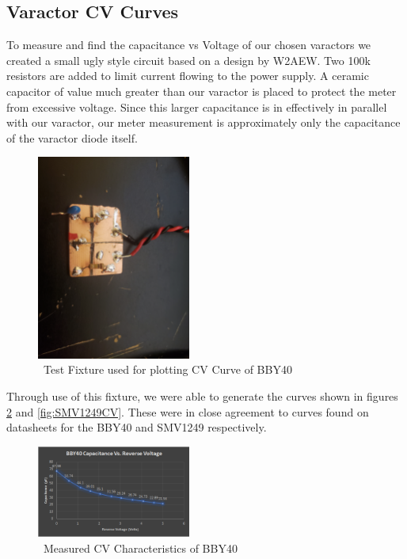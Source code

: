 \documentclass[journal]{IEEEtran}
\begin{document}
\subsection{Varactor CV Curves}\label{subsec:CVCurves}

To measure and find the capacitance vs Voltage of our chosen varactors we created a small ugly style circuit based on a design by W2AEW. Two 100k resistors are added to limit current flowing to the power supply. A ceramic capacitor of value much greater than our varactor is placed to protect the meter from excessive voltage. Since this larger capacitance is in effectively in parallel with our varactor, our meter measurement is approximately only the capacitance of the varactor diode itself. 

\begin{figure}[htb]
\centering
\includegraphics[width=0.45\textwidth]{BBY40_capacitance_testfixture}
\caption{\ Test Fixture used for plotting CV Curve of BBY40
}\label{fig:CVTestFixt}
\end{figure}



Through use of this fixture, we were able to generate the curves shown in figures \ref{fig:BBY40CV} and \ref{fig:SMV1249CV}. These were in close agreement to curves found on datasheets for the BBY40 and SMV1249 respectively.
 
\begin{figure}[htb]
\centering
\includegraphics[width=0.45\textwidth]{bbY40CV}
\caption{\ Measured CV Characteristics of BBY40 
}\label{fig:BBY40CV}
\end{figure}
 
\end{document}
